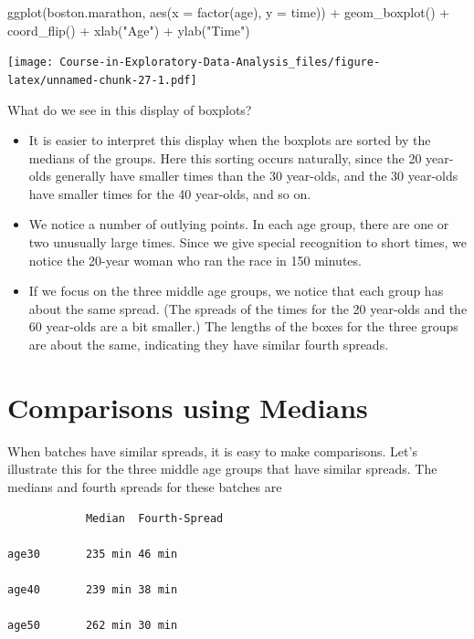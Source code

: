 \documentclass[
]{book}
\newenvironment{Shaded}{\begin{snugshade}}{\end{snugshade}}
\newcommand{\AttributeTok}[1]{\textcolor[rgb]{0.77,0.63,0.00}{#1}}
\newcommand{\FunctionTok}[1]{\textcolor[rgb]{0.00,0.00,0.00}{#1}}
\newcommand{\NormalTok}[1]{#1}
\newcommand{\SpecialCharTok}[1]{\textcolor[rgb]{0.00,0.00,0.00}{#1}}
\newcommand{\StringTok}[1]{\textcolor[rgb]{0.31,0.60,0.02}{#1}}
\begin{document}
\begin{Shaded}
\begin{Highlighting}[]
\FunctionTok{ggplot}\NormalTok{(boston.marathon, }\FunctionTok{aes}\NormalTok{(}\AttributeTok{x =} \FunctionTok{factor}\NormalTok{(age), }\AttributeTok{y =}\NormalTok{ time)) }\SpecialCharTok{+}
  \FunctionTok{geom\_boxplot}\NormalTok{() }\SpecialCharTok{+} \FunctionTok{coord\_flip}\NormalTok{() }\SpecialCharTok{+}
  \FunctionTok{xlab}\NormalTok{(}\StringTok{"Age"}\NormalTok{) }\SpecialCharTok{+} \FunctionTok{ylab}\NormalTok{(}\StringTok{"Time"}\NormalTok{)}
\end{Highlighting}
\end{Shaded}

\texttt{[image: Course-in-Exploratory-Data-Analysis\_files/figure-latex/unnamed-chunk-27-1.pdf]}

What do we see in this display of boxplots?

\begin{itemize}
\item
  It is easier to interpret this display when the boxplots are sorted by the medians of the groups. Here this sorting occurs naturally, since the 20 year-olds generally have smaller times than the 30 year-olds, and the 30 year-olds have smaller times for the 40 year-olds, and so on.
\item
  We notice a number of outlying points. In each age group, there are one or two unusually large times. Since we give special recognition to short times, we notice the 20-year woman who ran the race in 150 minutes.
\item
  If we focus on the three middle age groups, we notice that each group has about the same spread. (The spreads of the times for the 20 year-olds and the 60 year-olds are a bit smaller.) The lengths of the boxes for the three groups are about the same, indicating they have similar fourth spreads.
\end{itemize}

\hypertarget{comparisons-using-medians}{%
\section{Comparisons using Medians}\label{comparisons-using-medians}}

When batches have similar spreads, it is easy to make comparisons. Let's illustrate this for the three middle age groups that have similar spreads. The medians and fourth spreads for these batches are

\begin{verbatim}
            Median  Fourth-Spread

age30       235 min 46 min

age40       239 min 38 min

age50       262 min 30 min
\end{verbatim}
\end{document}
